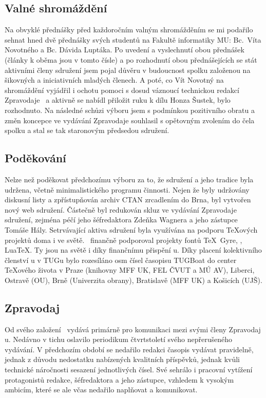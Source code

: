 \subsection*{Valné shromáždění}
Na obvyklé přednášky před každoročním valným shromážděním se mi podařilo sehnat hned dvě přednášky svých studentů na Fakultě informatiky MU: Bc.\ Víta Novotného a Bc. Dávida Luptáka. Po uvedení a vyslechnutí obou přednášek (články k oběma jsou v tomto čísle) a po rozhodnutí obou přednášejících se stát aktivními členy sdružení jsem pojal důvěru v budoucnost spolku založenou na šikovných a iniciativních mladých členech.  A poté, co Vít Novotný na shromáždění vyjádřil i ochotu pomoci s dosud váznoucí technickou redakcí Zpravodaje \CSTUG\ a aktivně se nabídl přiložit ruku k dílu Honza Šustek, bylo rozhodnuto. Na následné schůzi výboru jsem s podmínkou pozitivního obratu a změn koncepce ve vydávání Zpravodaje souhlasil s opětovným zvolením do čela spolku a stal se tak staronovým předsedou sdružení.
\subsection*{Poděkování}
Nelze než poděkovat předchozímu výboru za to, že sdružení a jeho tradice byla udržena, včetně minimalistického programu činnosti. Nejen že byly udržovány diskusní listy a zpřístupňován archiv CTAN zrcadlením do Brna, byl vytvořen nový web sdružení. Částečně byl redukován skluz ve vydávání Zpravodaje sdružení, zejména péčí jeho šéfredaktora Zdeňka Wagnera a jeho zástupce Tomáše Hály.
Setrvávající aktiva sdružení byla využívána na podporu \TeX ových projektů doma i ve světě. \CSTUG\ finančně podporoval projekty fontů \TeX\ Gyre, \MP, Lua\TeX. Ty jsou na světě i díky finančnímu přispění \CSTUG u. Díky placení kolektivního členství \CSTUG u v TUGu bylo rozesíláno osm čísel časopisu TUGBoat do center \TeX ového života v Praze (knihovny MFF UK, FEL ČVUT a MÚ AV), Liberci, Ostravě (OU), Brně (Univerzita obrany), Bratislavě (MFF UK) a Košicích (UJŠ).
\subsection*{Zpravodaj}
Od svého založení \CSTUG\ vydává primárně pro komunikaci mezi svými členy Zpravodaj \CSTUG u.  Nedávno v tichu oslavilo periodikum čtvrtstoletí svého nepřerušeného vydávání.  V předchozím období se nedařilo redakci časopis vydávat pravidelně, jednak z důvodu nedostatku nabízených kvalitních příspěvků, jednak kvůli technické náročnosti sesazení jednotlivých čísel.  Své sehrálo i pracovní vytížení protagonistů redakce, šéfredaktora a jeho zástupce, vzhledem k vysokým ambicím, které se ale včas nedařilo naplňovat a komunikovat.

